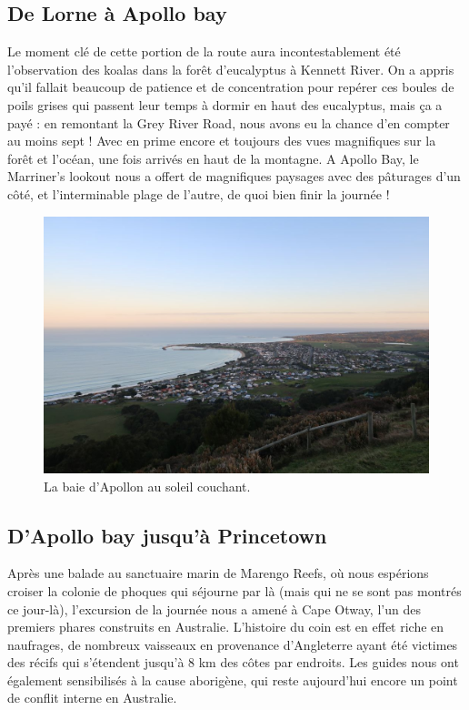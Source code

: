 \hypertarget{de-lorne-uxe0-apollo-bay}{%
\subsection{De Lorne à Apollo bay}\label{de-lorne-uxe0-apollo-bay}}

Le moment clé de cette portion de la route aura incontestablement été
l'observation des koalas dans la forêt d'eucalyptus à Kennett River. On
a appris qu'il fallait beaucoup de patience et de concentration pour
repérer ces boules de poils grises qui passent leur temps à dormir en
haut des eucalyptus, mais ça a payé : en remontant la Grey River Road,
nous avons eu la chance d'en compter au moins sept ! Avec en prime
encore et toujours des vues magnifiques sur la forêt et l'océan, une
fois arrivés en haut de la montagne. A Apollo Bay, le Marriner's lookout
nous a offert de magnifiques paysages avec des pâturages d'un côté, et
l'interminable plage de l'autre, de quoi bien finir la journée !

\begin{figure}
\centering
\includegraphics{images/20180731_apollobay.JPG}
\caption{La baie d'Apollon au soleil couchant.}
\end{figure}

\hypertarget{dapollo-bay-jusquuxe0-princetown}{%
\subsection{D'Apollo bay jusqu'à
Princetown}\label{dapollo-bay-jusquuxe0-princetown}}

Après une balade au sanctuaire marin de Marengo Reefs, où nous espérions
croiser la colonie de phoques qui séjourne par là (mais qui ne se sont
pas montrés ce jour-là), l'excursion de la journée nous a amené à Cape
Otway, l'un des premiers phares construits en Australie. L'histoire du
coin est en effet riche en naufrages, de nombreux vaisseaux en
provenance d'Angleterre ayant été victimes des récifs qui s'étendent
jusqu'à 8 km des côtes par endroits. Les guides nous ont également
sensibilisés à la cause aborigène, qui reste aujourd'hui encore un point
de conflit interne en Australie.

